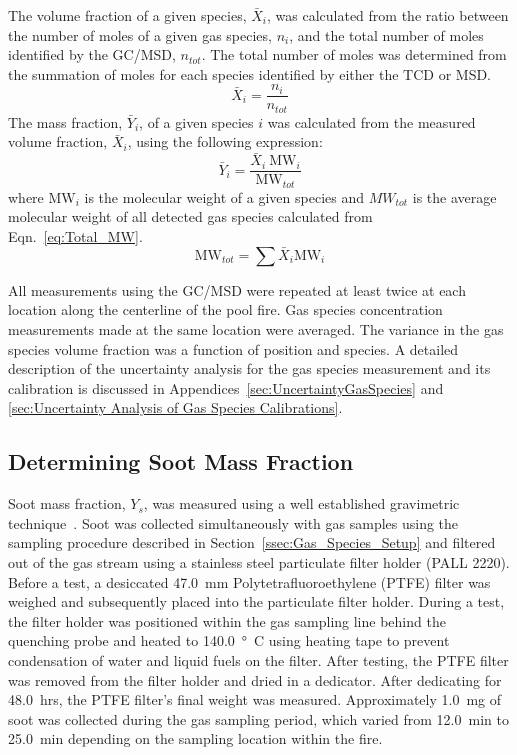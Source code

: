 \documentclass[12pt]{article}
\begin{document}
The volume fraction of a given species, $\bar{X}_{i}$, was calculated from the ratio between the number of moles of a given gas species, $n_{i}$, and the total number of moles identified by the GC/MSD, $n_{tot}$. The total number of moles was determined from the summation of moles for each species identified by either the TCD or MSD.
\begin{equation}\label{eq:volume_fraction}
  	\bar{X}_{i}= \frac{n_{i}}{n_{tot}}
\end{equation}
The mass fraction, $\bar{Y}_{i}$, of a given species $i$ was calculated from the measured volume fraction, $\bar{X}_{i}$, using the following expression:
\begin{equation}\label{eq:mass_fraction}
	\bar{Y}_{i}=\frac{\bar{X}_{i}~{\textrm{MW}_{i}}}{{\textrm{MW}_{tot}}}
\end{equation}
where ${{\textrm{MW}_{i}}}$ is the molecular weight of a given species and ${{MW_{tot}}}$ is the average molecular weight of all detected gas species calculated from Eqn.~\ref{eq:Total_MW}.
\begin{equation}\label{eq:Total_MW}
	{\textrm{MW}_{tot}}=\sum{\bar{X}_{i}{\textrm{MW}_{i}}}
\end{equation}

All measurements using the GC/MSD were repeated at least twice at each location along the centerline of the pool fire. Gas species concentration measurements made at the same location were averaged. The variance in the gas species volume fraction was a function of position and species. A detailed description of the uncertainty analysis for the gas species measurement and its calibration is discussed in Appendices~\ref{sec:UncertaintyGasSpecies} and \ref{sec:Uncertainty Analysis of Gas Species Calibrations}.

\subsection{Determining Soot Mass Fraction}
\label{ssec:Soot_Setup}

Soot mass fraction, $Y_{s}$, was measured using a well established gravimetric technique~\cite{Choi1995}. Soot was collected simultaneously with gas samples using the sampling procedure described in Section~\ref{ssec:Gas_Species_Setup} and filtered out of the gas stream using a stainless steel particulate filter holder (PALL 2220).  Before a test, a desiccated \SI{47.0}{mm} Polytetrafluoroethylene (PTFE) filter was weighed and subsequently placed into the particulate filter holder. During a test, the filter holder was positioned within the gas sampling line behind the quenching probe and heated to \SI{140.0}{\degree C} using heating tape to prevent condensation of water and liquid fuels on the filter. After testing, the PTFE filter was removed from the filter holder and dried in a dedicator. After dedicating for \SI{48.0}{hrs}, the PTFE filter’s final weight was measured. Approximately \SI{1.0}{mg} of soot was collected during the gas sampling period, which varied from \SI{12.0}{min} to \SI{25.0}{min} depending on the sampling location within the fire.
\end{document}
